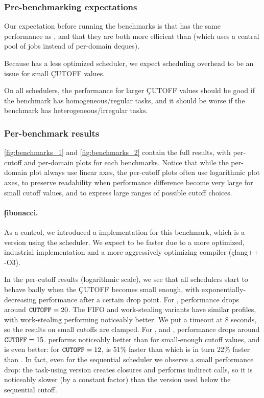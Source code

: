 \subsubsection{Pre-benchmarking expectations}

Our expectation before running the benchmarks is that \Parabs has the same performance as \Domainslib, and that they are both more efficient than \Moonpool (which uses a central pool of jobs instead of per-domain deques).

Because \Moonpool has a less optimized scheduler, we expect scheduling overhead to be an issue for small \c{CUTOFF} values.

On all schedulers, the performance for larger \c{CUTOFF} values should be good if the benchmark has homogeneous/regular tasks, and it should be worse if the benchmark has heterogeneous/irregular tasks.

\subsubsection{Per-benchmark results}



\cref{fig:benchmarks_1} and \cref{fig:benchmarks_2} contain the full results, with per-cutoff and per-domain plots for each benchmarks. Notice that while the per-domain plot always use linear axes, the per-cutoff plots often use logarithmic plot axes, to preserve readability when performance difference become very large for small cutoff values, and to express large ranges of possible cutoff choices.

\paragraph{\c{fibonacci}.}

As a control, we introduced a \Taskflow implementation for this benchmark, which is a \Cpp version using the \Taskflow scheduler.
We expect \Taskflow to be faster due to a more optimized, industrial implementation and a more aggressively optimizing compiler (\c{clang++ -O3}).

In the per-cutoff results (logarithmic scale), we see that all schedulers start to behave badly when the \c{CUTOFF} becomes small enough, with exponentially-decreasing performance after a certain drop point.
For \Moonpool, performance drops around $\texttt{CUTOFF} = 20$. The FIFO and work-stealing variants have similar profiles, with work-stealing performing noticeably better. We put a timeout at 8 seconds, so the results on small cutoffs are clamped.
For \Parabs, \Domainslib and \Taskflow, performance drops around $\texttt{CUTOFF} = 15$. \Parabs performs noticeably better than \Domainslib for small-enough cutoff values, and \Taskflow is even better: for $\texttt{CUTOFF} = 12$, \Taskflow is 51\% faster than \Parabs which is in turn 22\% faster than \Domainslib.
In fact, even for the sequential scheduler we observe a small performance drop: the task-using version creates closures and performs indirect calls, so it is noticeably slower (by a constant factor) than the version used below the sequential cutoff.

